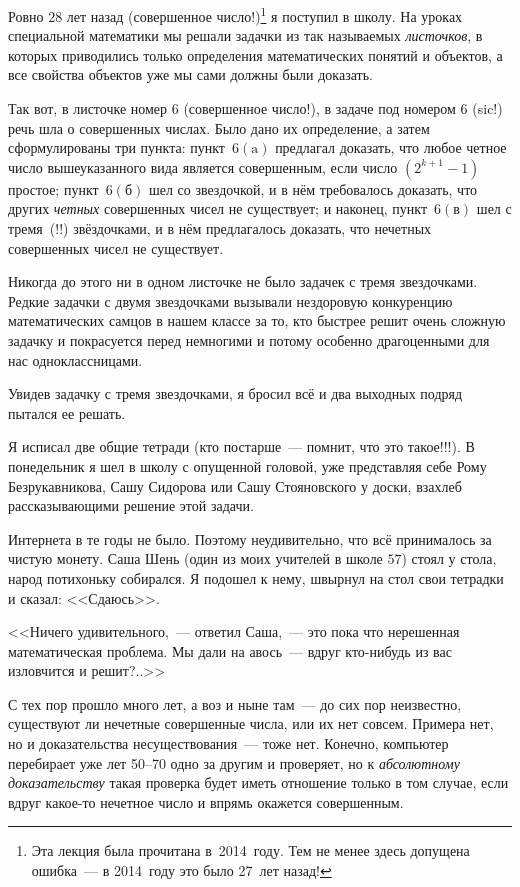 Ровно $28$ лет назад (совершенное число!)\footnote{Эта лекция была прочитана в~2014~году.
Тем не менее здесь допущена ошибка~--- в 2014~году это было 27~лет назад!}
я поступил в  школу.
 На уроках специальной математики мы
решали задачки из так называемых {\em листочков}, в которых приводились только определения
математических понятий и объектов, а все свойства объектов уже мы сами должны были доказать.

Так вот, в листочке номер $6$ (совершенное число!), в задаче под номером $6$ (sic!) речь шла
о совершенных числах. Было дано их определение, а затем сформулированы три пункта: пункт~$6(\text{a})$
предлагал доказать, что любое четное число вышеуказанного вида является совершенным,
если число $(2^{k+1}-1)$ простое; пункт~$6(\text{б})$ шел со звездочкой, и в нём требовалось доказать,
что других \textit{четных} совершенных чисел не существует;
 и наконец, пункт~$6(\text{в})$ шел с тремя~(!!)
звёздочками, и в нём предлагалось доказать, что нечетных совершенных чисел не существует.

Никогда до этого ни в одном листочке не было задачек с тремя звездочками. Редкие задачки
с двумя звездочками вызывали нездоровую конкуренцию математических самцов в нашем
классе за то, кто быстрее решит очень сложную задачку и покрасуется перед немногими и
потому особенно драгоценными для нас одноклассницами.

Увидев задачку с тремя звездочками, я бросил всё и два выходных подряд пытался ее решать.

Я исписал две общие тетради (кто постарше~--- помнит, что это такое!!!). В понедельник я шел
в школу с опущенной головой, уже представляя себе Рому Безрукавникова, Сашу Сидорова
или Сашу Стояновского у доски, взахлеб рассказывающими решение этой задачи.

Интернета в те годы не было. Поэтому неудивительно, что всё принималось за чистую монету.
Саша Шень (один из моих учителей в школе $57$) стоял у стола, народ потихоньку собирался.
Я подошел к нему, швырнул на стол свои тетрадки и сказал: <<Сдаюсь>>.

<<Ничего удивительного,~--- ответил Саша,~--- это пока что нерешенная математическая проблема.
Мы дали на авось~--- вдруг кто-нибудь из вас изловчится и решит?..>>

С тех пор прошло много лет, а воз и ныне там~--- до сих пор неизвестно, существуют ли нечетные
совершенные числа, или их нет совсем.
 Примера нет, но и доказательства несуществования~---
тоже нет. Конечно, компьютер перебирает уже лет 50--70 одно за другим и проверяет, но к
{\em абсолютному доказательству} такая проверка будет иметь отношение только в том
случае, если вдруг какое-то нечетное число и впрямь окажется совершенным.

